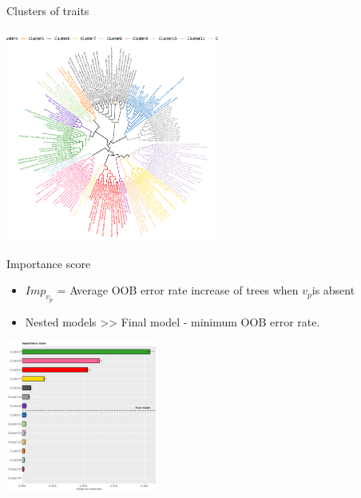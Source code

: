 \documentclass[presentation]{beamer}
\begin{document}
\begin{frame}[label={sec:orgf6385cc}]{Clusters of traits}
\begin{center}
\includegraphics[width=7cm]{./plots/dend_phen.png}
\end{center}
\end{frame}

\begin{frame}[label={sec:orgaf69e43}]{Importance score}
\begin{itemize}
\item \(Imp_{v_p}\) = Average OOB error rate increase of trees when \(v_p\)is absent
\item Nested models >> Final model - minimum OOB error rate.
\end{itemize}
\begin{center}
\includegraphics[width=5cm]{./plots/clusimp_phen.png}
\end{center}
\end{frame}
\end{document}
